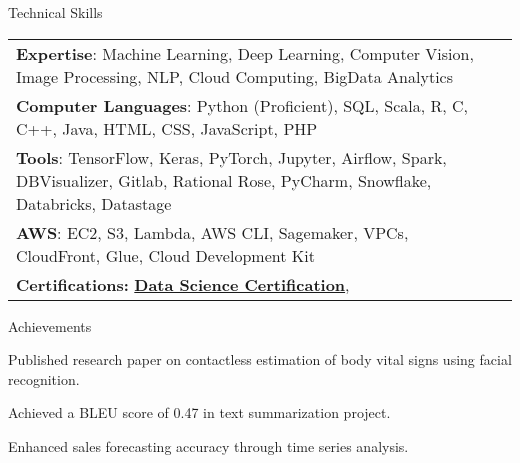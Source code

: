 \documentclass{resume} %
\begin{document}
    \begin{rSection}{Technical Skills}
        \begin{tabular}{ @{} l @{\hspace{1ex}} l }
                                \textbf{Expertise}: Machine Learning, Deep Learning, Computer Vision, Image Processing, NLP, Cloud Computing, BigData Analytics\\
                                \textbf{Computer Languages}: Python (Proficient), SQL, Scala, R, C, C++, Java, HTML, CSS, JavaScript, PHP\\
                                \textbf{Tools}: TensorFlow, Keras, PyTorch, Jupyter, Airflow, Spark, DBVisualizer, Gitlab, Rational Rose, PyCharm, Snowflake, Databricks, Datastage\\
                                \textbf{AWS}: EC2, S3, Lambda, AWS CLI, Sagemaker, VPCs, CloudFront, Glue, Cloud Development Kit\\
                        \textbf{Certifications:} 
                                            \href{None}{\textbf{Data Science Certification}},\\
                                 
        \end{tabular}
    \end{rSection}
 

    \begin{rSection}{Achievements}
        \begin{rSubsection}{}{}{}
                            \item Published research paper on contactless estimation of body vital signs using facial recognition.
                            \item Achieved a BLEU score of 0.47 in text summarization project.
                            \item Enhanced sales forecasting accuracy through time series analysis.
                    \end{rSubsection}
    \end{rSection}
\end{document}

